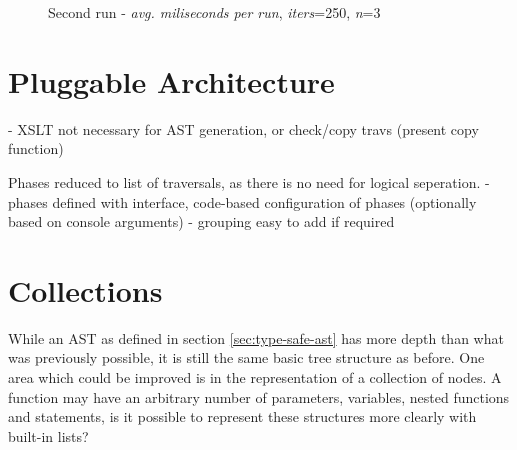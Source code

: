\documentclass[twoside,openright]{uva-bachelor-thesis}
\begin{document}
			\begin{figure}
				\centering
				\caption{Second run - \emph{avg. miliseconds per run}, \emph{iters}=250, \emph{n}=3}
				\label{fig:second-run}
			\end{figure}
			
				
	\section{Pluggable Architecture}
		- XSLT not necessary for AST generation, or check/copy travs (present copy function)
		
		Phases reduced to list of traversals, as there is no need for logical seperation.
		- phases defined with interface, code-based configuration of phases (optionally based on console arguments)
		- grouping easy to add if required
	
	
	\section{Collections}
		While an AST as defined in section \ref{sec:type-safe-ast} has more depth than what was previously possible, it is still the same basic tree structure as before. One area which could be improved is in the representation of a collection of nodes. A function may have an arbitrary number of parameters, variables, nested functions and statements, is it possible to represent these structures more clearly with built-in lists?
		
\end{document}
